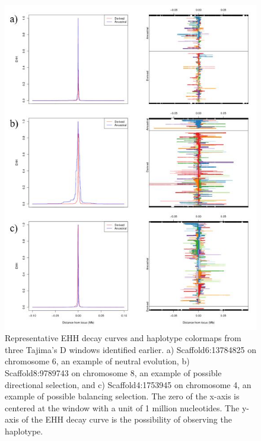 \begin{figure}[h!]
    \centering
    \includegraphics[scale=1]{figs/5.JPG}
    \caption{Representative EHH decay curves and haplotype colormaps from three Tajima’s D windows identified earlier. a) Scaffold6:13784825 on chromosome 6, an example of neutral evolution, b) Scaffold8:9789743 on chromosome 8, an example of possible directional selection, and c) Scaffold4:1753945 on chromosome 4, an example of possible balancing selection. The zero of the x-axis is centered at the window with a unit of 1 million nucleotides. The y-axis of the EHH decay curve is the possibility of observing the haplotype.}
    \label{fig:5}
\end{figure}

